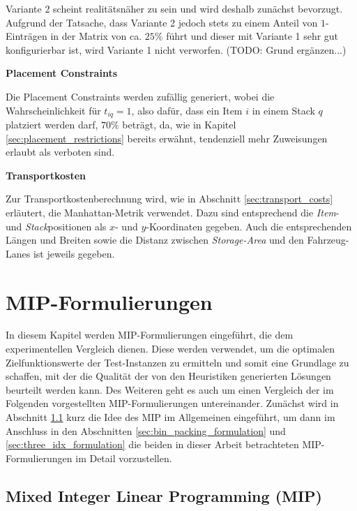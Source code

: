 Variante 2 scheint realitätsnäher zu sein und wird deshalb zunächst bevorzugt. Aufgrund der Tatsache, dass Variante 2 jedoch stets
zu einem Anteil von $1$-Einträgen in der Matrix von ca. $25\%$ führt und dieser mit Variante 1 sehr gut konfigurierbar ist, wird Variante 1 nicht verworfen. (TODO: Grund ergänzen...)

\textbf{Placement Constraints}

Die Placement Constraints werden zufällig generiert, wobei die Wahrscheinlichkeit für $t_{iq} = 1$, also dafür,
dass ein Item $i$ in einem Stack $q$ platziert werden darf, $70 \%$ beträgt, da, wie in Kapitel \ref{sec:placement_restrictions} bereits erwähnt, tendenziell mehr Zuweisungen erlaubt als verboten sind.

\textbf{Transportkosten}

Zur Transportkostenberechnung wird, wie in Abschnitt \ref{sec:transport_costs} erläutert, die Manhattan-Metrik verwendet. Dazu sind
entsprechend die \textit{Item}- und \textit{Stack}positionen als $x$- und $y$-Koordinaten gegeben. Auch die entsprechenden Längen und Breiten sowie die Distanz zwischen \textit{Storage-Area} und den Fahrzeug-Lanes ist jeweils gegeben.

\pagebreak

\section{MIP-Formulierungen}
\label{sec:mip_formulations}

In diesem Kapitel werden MIP-Formulierungen eingeführt, die dem experimentellen Vergleich dienen.
Diese werden verwendet, um die optimalen Zielfunktionswerte der Test-Instanzen zu ermitteln und somit eine Grundlage zu schaffen, mit der die Qualität der von den Heuristiken generierten Lösungen beurteilt werden kann. Des Weiteren geht es auch um einen Vergleich der im Folgenden vorgestellten MIP-Formulierungen untereinander. Zunächst wird in Abschnitt \ref{sec:mip_definition} kurz die Idee des MIP im Allgemeinen
eingeführt, um dann im Anschluss in den Abschnitten \ref{sec:bin_packing_formulation} und \ref{sec:three_idx_formulation} die beiden in dieser Arbeit betrachteten MIP-Formulierungen im Detail vorzustellen.

\subsection{Mixed Integer Linear Programming (MIP)}
\label{sec:mip_definition}

